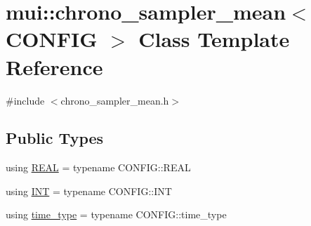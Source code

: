 \hypertarget{classmui_1_1chrono__sampler__mean}{}\section{mui\+:\+:chrono\+\_\+sampler\+\_\+mean$<$ C\+O\+N\+F\+IG $>$ Class Template Reference}
\label{classmui_1_1chrono__sampler__mean}


{\ttfamily \#include $<$chrono\+\_\+sampler\+\_\+mean.\+h$>$}

\subsection*{Public Types}
\begin{DoxyCompactItemize}
\item 
using \hyperlink{classmui_1_1chrono__sampler__mean_a31c93d26c0a7b8026ef9c3b0d0ddc5d2}{R\+E\+AL} = typename C\+O\+N\+F\+I\+G\+::\+R\+E\+AL
\item 
using \hyperlink{classmui_1_1chrono__sampler__mean_a2f7b78dba6112d39345f077008d2b453}{I\+NT} = typename C\+O\+N\+F\+I\+G\+::\+I\+NT
\item 
using \hyperlink{classmui_1_1chrono__sampler__mean_aa818a9c8850aa9fda611430c158a0072}{time\+\_\+type} = typename C\+O\+N\+F\+I\+G\+::time\+\_\+type
\end{DoxyCompactItemize}
